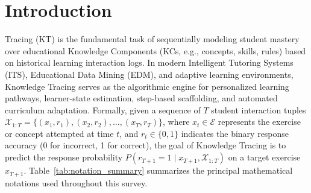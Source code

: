 \documentclass[10pt,journal,compsoc]{IEEEtran}
\begin{document}
\maketitle
\IEEEdisplaynontitleabstractindextext
\IEEEpeerreviewmaketitle

\section{Introduction}
 Tracing (KT) is the fundamental task of sequentially modeling student mastery over educational Knowledge Components (KCs, e.g., concepts, skills, rules) based on historical learning interaction logs. In modern Intelligent Tutoring Systems (ITS), Educational Data Mining (EDM), and adaptive learning environments, Knowledge Tracing serves as the algorithmic engine for personalized learning pathways, learner-state estimation, step-based scaffolding, and automated curriculum adaptation. Formally, given a sequence of $T$ student interaction tuples $\mathcal{X}_{1:T} = \{(x_1, r_1), (x_2, r_2), \dots, (x_T, r_T)\}$, where $x_t \in \mathcal{E}$ represents the exercise or concept attempted at time $t$, and $r_t \in \{0, 1\}$ indicates the binary response accuracy (0 for incorrect, 1 for correct), the goal of Knowledge Tracing is to predict the response probability $P(r_{T+1} = 1 \mid x_{T+1}, \mathcal{X}_{1:T})$ on a target exercise $x_{T+1}$. Table~\ref{tab:notation_summary} summarizes the principal mathematical notations used throughout this survey.
\end{document}
